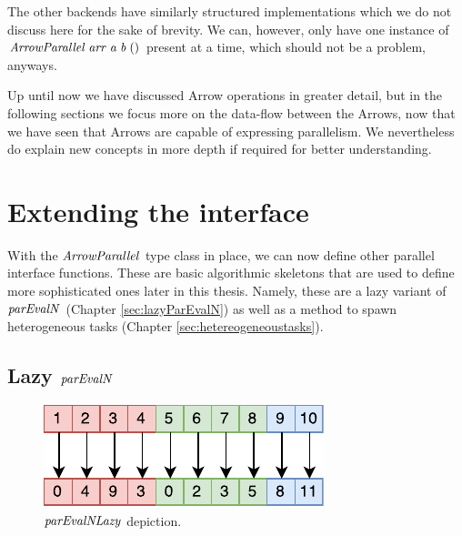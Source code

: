 \documentclass[paper=A4,twoside=true,openright,parskip=full,chapterprefix=true,headings=normal,bibliography=totoc,listof=totoc,titlepage=on,captions=tableabove,draft=false,british]{scrreprt}%
\begin{document}
The other backends have similarly structured implementations which we do
not discuss here for the sake of brevity. We can, however, only have one
instance of \ensuremath{\Conid{ArrowParallel}\;\Varid{arr}\;\Varid{a}\;\Varid{b}\;()} present at a time, which should
not be a problem, anyways.

Up until now we have discussed Arrow operations in greater detail, but
in the following sections we focus more on the data-flow between the
Arrows, now that we have seen that Arrows are capable of expressing
parallelism. We nevertheless do explain new concepts in more depth if
required for better understanding.

\newpage

\hypertarget{extending-the-interface}{%
\section{Extending the interface}\label{extending-the-interface}}

\label{sec:extending-interface}

With the \ensuremath{\Conid{ArrowParallel}} type class in place, we can now define other
parallel interface functions. These are basic algorithmic skeletons that
are used to define more sophisticated ones later in this thesis. Namely,
these are a lazy variant of \ensuremath{\Varid{parEvalN}} (Chapter \ref{sec:lazyParEvalN})
as well as a method to spawn heterogeneous tasks (Chapter
\ref{sec:hetereogeneoustasks}).

\hypertarget{lazy-parevaln}{%
\subsection{\texorpdfstring{Lazy
\ensuremath{\Varid{parEvalN}}}{Lazy }}\label{lazy-parevaln}}

\label{sec:lazyParEvalN}

\begin{figure}[h]
\centering
\includegraphics{src/img/parEvalNLazy.pdf}
\caption{\ensuremath{\Varid{parEvalNLazy}} depiction.\label{fig:parEvalNLazyImg}}
\end{figure}
\end{document}
